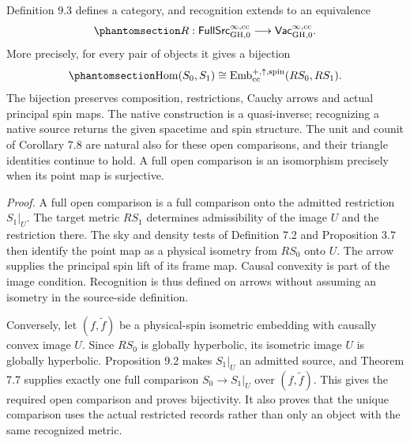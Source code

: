 \documentclass[
  english,
  11pt,
  reqno]{amsart}
\begin{document}
Definition 9.3 defines a category, and recognition extends to an
equivalence
\begin{equation}\protect\phantomsection\label{eq:global-source-embedding-equivalence}{
R:\mathsf{FullSrc}^{\infty,\mathrm{cc}}_{\mathrm{GH},0}
\longrightarrow
\mathsf{Vac}^{\infty,\mathrm{cc}}_{\mathrm{GH},0}.
}\end{equation} More precisely, for every pair of objects it gives a
bijection
\begin{equation}\protect\phantomsection\label{eq:global-source-embedding-hom}{
\operatorname{Hom}(S_0,S_1)
\cong
\operatorname{Emb}^{+,\uparrow,\mathrm{spin}}_{\mathrm{cc}}
(RS_0,RS_1).
}\end{equation} The bijection preserves composition, restrictions,
Cauchy arrows and actual principal spin maps. The native construction is
a quasi-inverse; recognizing a native source returns the given spacetime
and spin structure. The unit and counit of Corollary 7.8 are natural
also for these open comparisons, and their triangle identities continue
to hold. A full open comparison is an isomorphism precisely when its
point map is surjective.

\emph{Proof.} A full open comparison is a full comparison onto the
admitted restriction \(S_1|_U\). The target metric \(RS_1\) determines
admissibility of the image \(U\) and the restriction there. The sky and
density tests of Definition 7.2 and Proposition 3.7 then identify the
point map as a physical isometry from \(RS_0\) onto \(U\). The arrow
supplies the principal spin lift of its frame map. Causal convexity is
part of the image condition. Recognition is thus defined on arrows
without assuming an isometry in the source-side definition.

Conversely, let \((f,\widetilde f)\) be a physical-spin isometric
embedding with causally convex image \(U\). Since \(RS_0\) is globally
hyperbolic, its isometric image \(U\) is globally hyperbolic.
Proposition 9.2 makes \(S_1|_U\) an admitted source, and Theorem 7.7
supplies exactly one full comparison \(S_0\to S_1|_U\) over
\((f,\widetilde f)\). This gives the required open comparison and proves
bijectivity. It also proves that the unique comparison uses the actual
restricted records rather than only an object with the same recognized
metric.
\end{document}
